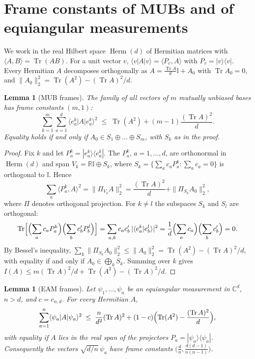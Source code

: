 \documentclass[11pt]{amsart}
\newtheorem{lemma}[theorem]{Lemma}
\theoremstyle{definition}
\theoremstyle{remark}
\newcommand{\C}{\mathbb{C}}
\newcommand{\R}{\mathbb{R}}
\newcommand{\Tr}{\operatorname{Tr}}
\newcommand{\Herm}{\operatorname{Herm}}
\newcommand{\one}{\mathbb{I}}
\newcommand{\ket}[1]{|#1\rangle}
\newcommand{\bra}[1]{\langle #1|}
\begin{document}
\section{Frame constants of MUBs and of equiangular measurements}\label{sec:frames}

We work in the real Hilbert space $\Herm(d)$ of Hermitian matrices with $\langle A,B\rangle=\Tr(AB)$. For a unit
vector $v$, $\bra vA\ket v=\langle P_v,A\rangle$ with $P_v=\ket v\bra v$. Every Hermitian $A$ decomposes
orthogonally as $A=\frac{\Tr A}{d}\one+A_0$ with $\Tr A_0=0$, and
$\|A_0\|_2^2=\Tr(A^2)-(\Tr A)^2/d$.

\begin{lemma}[MUB frames]\label{lem:frameMUB}
The family of all vectors of $m$ mutually unbiased bases has frame constants $(m,1)$:
\[
\sum_{k=1}^m\sum_{a=1}^d\bra{e^k_a}A\ket{e^k_a}^2\;\le\;\Tr(A^2)+(m-1)\frac{(\Tr A)^2}{d}.
\]
Equality holds if and only if $A_0\in S_1\oplus\dots\oplus S_m$, with $S_k$ as in the proof.
\end{lemma}

\begin{proof}
Fix $k$ and let $P^k_a=\ket{e^k_a}\bra{e^k_a}$. The $P^k_a$, $a=1,\dots,d$, are orthonormal in $\Herm(d)$ and span
$V_k=\R\one\oplus S_k$, where $S_k=\{\sum_ac_aP^k_a:\sum_ac_a=0\}$ is orthogonal to $\one$. Hence
\[
\sum_a\langle P^k_a,A\rangle^2=\|\Pi_{V_k}A\|_2^2=\frac{(\Tr A)^2}{d}+\|\Pi_{S_k}A_0\|_2^2 ,
\]
where $\Pi$ denotes orthogonal projection. For $k\neq l$ the subspaces $S_k$ and $S_l$ are orthogonal:
\[
\Tr\Bigl[\Bigl(\sum_ac_aP^k_a\Bigr)\Bigl(\sum_bc'_bP^l_b\Bigr)\Bigr]=\sum_{a,b}c_ac'_b\,|\langle e^k_a|e^l_b\rangle|^2
=\frac1d\Bigl(\sum_ac_a\Bigr)\Bigl(\sum_bc'_b\Bigr)=0 .
\]
By Bessel's inequality, $\sum_k\|\Pi_{S_k}A_0\|_2^2\le\|A_0\|_2^2=\Tr(A^2)-(\Tr A)^2/d$, with equality if and only
if $A_0\in\bigoplus_kS_k$. Summing over $k$ gives $I(A)\le m(\Tr A)^2/d+\Tr(A^2)-(\Tr A)^2/d$.
\end{proof}

\begin{lemma}[EAM frames]\label{lem:frameEAM}
Let $\psi_1,\dots,\psi_n$ be an equiangular measurement in $\C^d$, $n>d$, and $c=c_{n,d}$. For every Hermitian $A$,
\[
\sum_{a=1}^n\bra{\psi_a}A\ket{\psi_a}^2\;\le\;\frac n{d^2}(\Tr A)^2+(1-c)\Bigl(\Tr(A^2)-\frac{(\Tr A)^2}{d}\Bigr),
\]
with equality if $A$ lies in the real span of the projectors $P_a=\ket{\psi_a}\bra{\psi_a}$. Consequently the
vectors $\sqrt{d/n}\,\psi_a$ have frame constants $\bigl(\frac dn,\frac{d(d-1)}{n(n-1)}\bigr)$.
\end{lemma}
\end{document}
